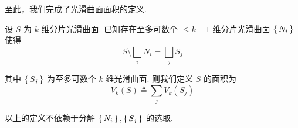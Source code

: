 至此，我们完成了光滑曲面面积的定义.


\begin{definition}
    设 $S$ 为 $k$ 维分片光滑曲面. 已知存在至多可数个 $\le k-1$ 维分片光滑曲面 $\set{N_i}$ 使得
$$
S\setminus\bigsqcup_iN_i=\bigsqcup_jS_j
$$

    其中 $\set{S_j}$ 为至多可数个 $k$ 维光滑曲面. 则我们定义 $S$ 的面积为
$$
V_k(S)\triangleq\sum_jV_k(S_j)
$$
\end{definition}

\begin{property}
    以上的定义不依赖于分解 $\set{N_i},\set{S_j}$ 的选取.
\end{property}
